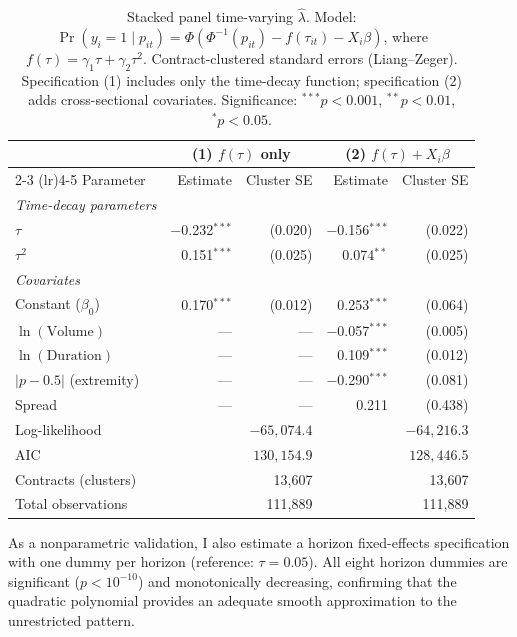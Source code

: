 \documentclass[12pt,a4paper]{article}
\begin{document}
\begin{table}[H]
\centering
\small
\caption{Stacked panel time-varying $\hat{\lambda}$. Model: $\Pr(y_i = 1 \mid p_{it}) = \Phi(\Phi^{-1}(p_{it}) - f(\tau_{it}) - X_i\beta)$, where $f(\tau) = \gamma_1\tau + \gamma_2\tau^2$. Contract-clustered standard errors (Liang--Zeger). Specification (1) includes only the time-decay function; specification (2) adds cross-sectional covariates. Significance: $^{***}p<0.001$, $^{**}p<0.01$, $^{*}p<0.05$.}
\label{tab:stacked_panel}
\begin{tabular}{lrrrr}
\toprule
 & \multicolumn{2}{c}{(1) $f(\tau)$ only} & \multicolumn{2}{c}{(2) $f(\tau) + X_i\beta$} \\
\cmidrule(lr){2-3} \cmidrule(lr){4-5}
Parameter & Estimate & Cluster SE & Estimate & Cluster SE \\
\midrule
\textit{Time-decay parameters} & & & & \\
$\tau$ & $-$0.232$^{***}$ & (0.020) & $-$0.156$^{***}$ & (0.022) \\
$\tau^2$ & 0.151$^{***}$ & (0.025) & 0.074$^{**}$ & (0.025) \\
\midrule
\textit{Covariates} & & & & \\
Constant ($\beta_0$) & 0.170$^{***}$ & (0.012) & 0.253$^{***}$ & (0.064) \\
$\ln(\text{Volume})$ & --- & --- & $-$0.057$^{***}$ & (0.005) \\
$\ln(\text{Duration})$ & --- & --- & 0.109$^{***}$ & (0.012) \\
$|p - 0.5|$ (extremity) & --- & --- & $-$0.290$^{***}$ & (0.081) \\
Spread & --- & --- & 0.211 & (0.438) \\
\midrule
Log-likelihood & \multicolumn{2}{r}{$-65{,}074.4$} & \multicolumn{2}{r}{$-64{,}216.3$} \\
AIC & \multicolumn{2}{r}{$130{,}154.9$} & \multicolumn{2}{r}{$128{,}446.5$} \\
Contracts (clusters) & \multicolumn{2}{r}{13,607} & \multicolumn{2}{r}{13,607} \\
Total observations & \multicolumn{2}{r}{111,889} & \multicolumn{2}{r}{111,889} \\
\bottomrule
\end{tabular}
\end{table}

As a nonparametric validation, I also estimate a horizon fixed-effects
specification with one dummy per horizon (reference: \(\tau = 0.05\)).
All eight horizon dummies are significant (\(p < 10^{-10}\)) and
monotonically decreasing, confirming that the quadratic polynomial
provides an adequate smooth approximation to the unrestricted pattern.
\end{document}
